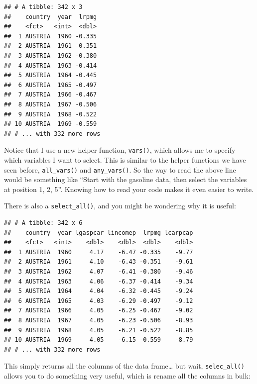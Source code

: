 \documentclass[]{gitbook}
\newenvironment{Shaded}{\begin{snugshade}}{\end{snugshade}}
\newcommand{\KeywordTok}[1]{\textcolor[rgb]{0.13,0.29,0.53}{\textbf{#1}}}
\newcommand{\NormalTok}[1]{#1}
\newcommand{\OperatorTok}[1]{\textcolor[rgb]{0.81,0.36,0.00}{\textbf{#1}}}
\newcommand{\StringTok}[1]{\textcolor[rgb]{0.31,0.60,0.02}{#1}}
\begin{document}
\begin{verbatim}
## # A tibble: 342 x 3
##    country  year  lrpmg
##    <fct>   <int>  <dbl>
##  1 AUSTRIA  1960 -0.335
##  2 AUSTRIA  1961 -0.351
##  3 AUSTRIA  1962 -0.380
##  4 AUSTRIA  1963 -0.414
##  5 AUSTRIA  1964 -0.445
##  6 AUSTRIA  1965 -0.497
##  7 AUSTRIA  1966 -0.467
##  8 AUSTRIA  1967 -0.506
##  9 AUSTRIA  1968 -0.522
## 10 AUSTRIA  1969 -0.559
## # ... with 332 more rows
\end{verbatim}

Notice that I use a new helper function, \texttt{vars()}, which allows me to specify which variables I want
to select. This is similar to the helper functions we have seen before, \texttt{all\_vars()}
and \texttt{any\_vars()}. So the way to read the above line would be something like ``Start with the
gasoline data, then select the variables at position 1, 2, 5''. Knowing how to read your code makes
it even easier to write.

There is also a \texttt{select\_all()}, and you might be wondering why it is useful:

\begin{Shaded}
\end{Shaded}

\begin{verbatim}
## # A tibble: 342 x 6
##    country  year lgaspcar lincomep  lrpmg lcarpcap
##    <fct>   <int>    <dbl>    <dbl>  <dbl>    <dbl>
##  1 AUSTRIA  1960     4.17    -6.47 -0.335    -9.77
##  2 AUSTRIA  1961     4.10    -6.43 -0.351    -9.61
##  3 AUSTRIA  1962     4.07    -6.41 -0.380    -9.46
##  4 AUSTRIA  1963     4.06    -6.37 -0.414    -9.34
##  5 AUSTRIA  1964     4.04    -6.32 -0.445    -9.24
##  6 AUSTRIA  1965     4.03    -6.29 -0.497    -9.12
##  7 AUSTRIA  1966     4.05    -6.25 -0.467    -9.02
##  8 AUSTRIA  1967     4.05    -6.23 -0.506    -8.93
##  9 AUSTRIA  1968     4.05    -6.21 -0.522    -8.85
## 10 AUSTRIA  1969     4.05    -6.15 -0.559    -8.79
## # ... with 332 more rows
\end{verbatim}

This simply returns all the columns of the data frame\ldots{} but wait, \texttt{selec\_all()} allows you to do
something very useful, which is rename all the columns in bulk:

\begin{Shaded}
\end{Shaded}
\end{document}
